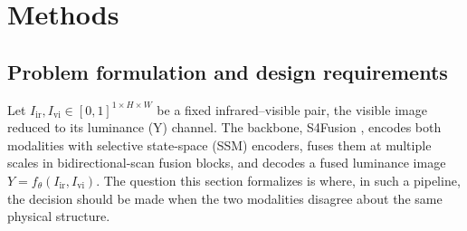 \documentclass[pdflatex,sn-mathphys-num]{sn-jnl}
\theoremstyle{thmstyleone}%
\theoremstyle{thmstyletwo}%
\theoremstyle{thmstylethree}%
\begin{document}
\section{Methods}\label{sec:methods}

\subsection{Problem formulation and design requirements}\label{sec:methods:problem}

Let $I_{\mathrm{ir}}, I_{\mathrm{vi}} \in [0,1]^{1\times H\times W}$ be a fixed infrared--visible pair, the visible image reduced to its luminance (Y) channel. The backbone, S4Fusion \cite{ma2025s4fusion}, encodes both modalities with selective state-space (SSM) encoders, fuses them at multiple scales in bidirectional-scan fusion blocks, and decodes a fused luminance image $Y = f_\theta(I_{\mathrm{ir}}, I_{\mathrm{vi}})$. The question this section formalizes is where, in such a pipeline, the decision should be made when the two modalities disagree about the same physical structure.
\end{document}
